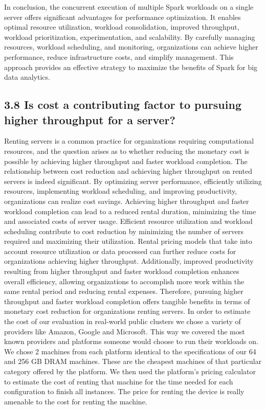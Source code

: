 \documentclass[twocolumn,10pt]{asme2e}
\begin{document}
In conclusion, the concurrent execution of multiple Spark workloads on a single server offers significant advantages for performance optimization. It enables optimal resource utilization, workload consolidation, improved throughput, workload prioritization, experimentation, and scalability. By carefully managing resources, workload scheduling, and monitoring, organizations can achieve higher performance, reduce infrastructure costs, and simplify management. This approach provides an effective strategy to maximize the benefits of Spark for big data analytics.

\subsection*{3.8 Is cost a contributing factor to pursuing higher throughput for a server?}
Renting servers is a common practice for organizations requiring computational resources, and the question arises as to whether reducing the monetary cost is possible by achieving higher throughput and faster workload completion. The relationship between cost reduction and achieving higher throughput on rented servers is indeed significant. By optimizing server performance, efficiently utilizing resources, implementing workload scheduling, and improving productivity, organizations can realize cost savings. Achieving higher throughput and faster workload completion can lead to a reduced rental duration, minimizing the time and associated costs of server usage. Efficient resource utilization and workload scheduling contribute to cost reduction by minimizing the number of servers required and maximizing their utilization. Rental pricing models that take into account resource utilization or data processed can further reduce costs for organizations achieving higher throughput. Additionally, improved productivity resulting from higher throughput and faster workload completion enhances overall efficiency, allowing organizations to accomplish more work within the same rental period and reducing rental expenses. Therefore, pursuing higher throughput and faster workload completion offers tangible benefits in terms of monetary cost reduction for organizations renting servers.
In order to estimate the cost of our evaluation in real-world public clusters we chose a variety of providers like Amazon, Google and Microsoft. This way we covered the most known providers and platforms someone would choose to run their workloads on. We chose 2 machines from each platform identical to the specifications of our 64 and 256 GB DRAM machines. These are the cheapest machines of that particular category offered by the platform. We then used the platform's pricing calculator to estimate the cost of renting that machine for the time needed for each configuration to finish all instances. The price for renting the device is really amenable to the cost for renting the machine.
\end{document}
